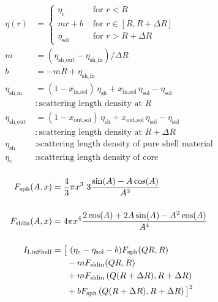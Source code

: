 \begin{align}
\eta(r)      & =
\begin{cases}
\eta_\text{c} & \text{~for~} r<R \\
m r + b  & \text{~for~} r \in [R,R+\Delta R] \\
\eta_\text{sol}  & \text{~for~} r>R+\Delta R
\end{cases}\\
m           & = (\eta_\text{sh\_out}-\eta_\text{sh\_in}) / \Delta R \\
b           & = -m R + \eta_\text{sh\_in} \\
\eta_\text{sh\_in}  & = (1 - x_\text{in,sol})  \, \eta_\text{sh} + x_\text{in,sol} \,\eta_\text{sol}-\eta_\text{sol} \\
                    & : \text{scattering length density at $R$} \nonumber \\
\eta_\text{sh\_out} & = (1 - x_\text{out,sol}) \, \eta_\text{sh} + x_\text{out,sol}\,\eta_\text{sol}-\eta_\text{sol} \\
                    & : \text{scattering length density at $R+\Delta R$} \nonumber \\
\eta_\text{sh}      & : \text{scattering length density of pure shell material} \nonumber \\
\eta_\text{c}       & : \text{scattering length density of core} \nonumber \\
\nonumber
\end{align}

\begin{align}
F_\text{sph}(A,x) & = \frac{4}{3}\pi x^3 \,\, 3\frac{\sin(A)-A\cos(A)}{A^3} \\[5mm]
F_\text{shlin}(A,x) & = 4\pi x^4 \frac{2\cos(A)+2A\sin(A)-A^2\cos(A)}{A^4} \\[5mm]
I_\text{LinShell}    & = \big[ \,\, (\eta_\text{c}-\eta_\text{sol}-b)F_\text{sph}(QR,R) \nonumber \\
             & \hspace{6mm} - mF_\text{shlin}(QR,R) \\
             & \hspace{6mm} + mF_\text{shlin}\left(Q(R+\Delta R),R+\Delta R\right) \nonumber \\
             & \hspace{6mm} + bF_\text{sph}\left(Q(R+\Delta R),R+\Delta R\right) \big]^2 \nonumber
\end{align}

\vspace{5mm}

